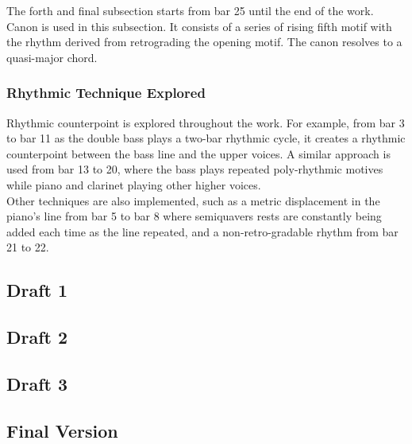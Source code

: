 \documentclass{article}
\begin{document}
The forth and final subsection starts from bar 25 until the end of the work. Canon is used in this subsection. It consists of a series of rising fifth motif with the rhythm derived from retrograding the opening motif. The canon resolves to a quasi-major chord.

\subsubsection{Rhythmic Technique Explored}
Rhythmic counterpoint is explored throughout the work. For example, from bar 3 to bar 11 as the double bass plays a two-bar rhythmic cycle, it creates a rhythmic counterpoint between the bass line and the upper voices. A similar approach is used from bar 13 to 20, where the bass plays repeated poly-rhythmic motives while piano and clarinet playing other higher voices.\\

Other techniques are also implemented, such as a metric displacement in the piano's line from bar 5 to bar 8 where semiquavers rests are constantly being added each time as the line repeated, and a non-retro-gradable rhythm from bar 21 to 22.

\newpage
\begin{center}
\vspace*{\fill}
\LARGE
\subsection{Draft 1}
\vspace*{\fill}
%
\end{center}
\newpage
\begin{center}
\vspace*{\fill}
\LARGE
\subsection{Draft 2}
\vspace*{\fill}
%
\end{center}
\newpage
\begin{center}
\vspace*{\fill}
\LARGE
\subsection{Draft 3}
\vspace*{\fill}
%
\end{center}
\newpage
\begin{center}
\vspace*{\fill}
\LARGE
\subsection{Final Version}
\vspace*{\fill}
%
\end{center}

\end{document}
